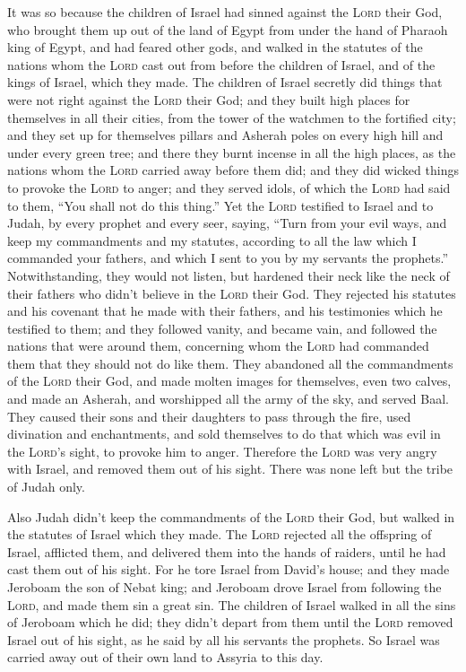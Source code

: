  It was so because the children of Israel had sinned
against the \textsc{Lord} their God, who brought them up out of the land
of Egypt from under the hand of Pharaoh king of Egypt, and had feared
other gods,  and walked in the statutes of the nations
whom the \textsc{Lord} cast out from before the children of Israel, and
of the kings of Israel, which they made.  The children of
Israel secretly did things that were not right against the \textsc{Lord}
their God; and they built high places for themselves in all their
cities, from the tower of the watchmen to the fortified city;
 and they set up for themselves pillars and Asherah poles
on every high hill and under every green tree;  and there
they burnt incense in all the high places, as the nations whom the
\textsc{Lord} carried away before them did; and they did wicked things
to provoke the \textsc{Lord} to anger;  and they served
idols, of which the \textsc{Lord} had said to them, ``You shall not do
this thing.''  Yet the \textsc{Lord} testified to Israel
and to Judah, by every prophet and every seer, saying, ``Turn from your
evil ways, and keep my commandments and my statutes, according to all
the law which I commanded your fathers, and which I sent to you by my
servants the prophets.''  Notwithstanding, they would not
listen, but hardened their neck like the neck of their fathers who
didn't believe in the \textsc{Lord} their God.  They
rejected his statutes and his covenant that he made with their fathers,
and his testimonies which he testified to them; and they followed
vanity, and became vain, and followed the nations that were around them,
concerning whom the \textsc{Lord} had commanded them that they should
not do like them.  They abandoned all the commandments of
the \textsc{Lord} their God, and made molten images for themselves, even
two calves, and made an Asherah, and worshipped all the army of the sky,
and served Baal.  They caused their sons and their
daughters to pass through the fire, used divination and enchantments,
and sold themselves to do that which was evil in the \textsc{Lord}'s
sight, to provoke him to anger.  Therefore the
\textsc{Lord} was very angry with Israel, and removed them out of his
sight. There was none left but the tribe of Judah only.

 Also Judah didn't keep the commandments of the
\textsc{Lord} their God, but walked in the statutes of Israel which they
made.  The \textsc{Lord} rejected all the offspring of
Israel, afflicted them, and delivered them into the hands of raiders,
until he had cast them out of his sight.  For he tore
Israel from David's house; and they made Jeroboam the son of Nebat king;
and Jeroboam drove Israel from following the \textsc{Lord}, and made
them sin a great sin.  The children of Israel walked in
all the sins of Jeroboam which he did; they didn't depart from them
 until the \textsc{Lord} removed Israel out of his sight,
as he said by all his servants the prophets. So Israel was carried away
out of their own land to Assyria to this day.

